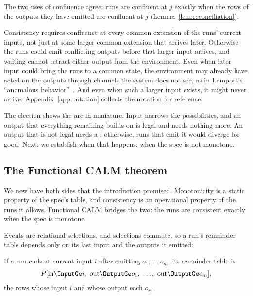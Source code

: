 The two uses of confluence agree: runs are confluent at $j$ exactly when the
rows of the outputs they have emitted are confluent at $j$
(Lemma~\ref{lem:reconciliation}).

Consistency requires confluence at every common extension of the runs' current
inputs, not just at some larger common extension that arrives later.  Otherwise
the runs could emit conflicting outputs before that larger input arrives, and
waiting cannot retract either output from the environment.  Even when later
input could bring the runs to a common state, the environment may already have
acted on the outputs through channels the system does not see, as in Lamport's
``anomalous behavior''~\cite{lamport1978time}.  And even when such a larger
input exists, it might never arrive.  Appendix~\ref{app:notation} collects the
notation for reference.

The election shows the arc in miniature.  Input narrows the possibilities, and
an output that everything remaining builds on is legal and needs nothing more.
An output that is not legal needs a \commitment; otherwise, runs that emit it
would diverge for good.  Next, we establish when that happens: when the spec is
not monotone.

\subsection{The Functional CALM theorem}
\label{sec:functional-calm-theorem}

We now have both sides that the introduction promised.  Monotonicity is a
static property of the spec's table, and consistency is an operational property
of the runs it allows.  Functional CALM bridges the two: the runs are
consistent exactly when the spec is monotone.

Events are relational
selections, and selections commute, so a run's remainder table depends only on
its last input and the outputs it emitted:

\begin{lemma}
\label{lem:run-residual}
If a run ends at current input $i$ after emitting
$o_1,\ldots,o_m$, its remainder table is
\begin{equation}
  P[\mathrm{in}\InputGe i,\ \mathrm{out}\OutputGe o_1,\ \ldots,\
    \mathrm{out}\OutputGe o_m],
  \label{eq:run-residual}
\end{equation}
the rows whose input \inrel $i$ and whose output \outrel each $o_r$.
\end{lemma}

